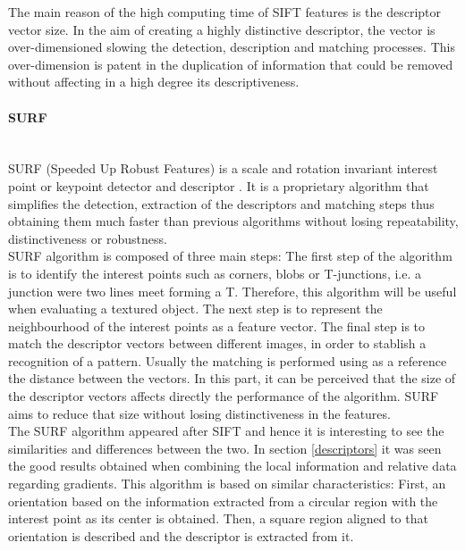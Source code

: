 The main reason of the high computing time of SIFT features is the descriptor vector size. 
In the aim of creating a highly distinctive descriptor, the vector is over-dimensioned slowing the detection, description and matching processes. 
This over-dimension is patent in the duplication of information that could be removed without affecting in a high degree its descriptiveness. 




\paragraph{SURF}\mbox{}\\

SURF (Speeded Up Robust Features) is a scale and rotation invariant interest point or keypoint detector and descriptor \cite{surf}. 
It is a proprietary algorithm that simplifies the detection, extraction of the descriptors and matching steps thus obtaining them much faster than previous algorithms without losing repeatability, distinctiveness or robustness. 
\\
\newpage
SURF algorithm is composed of three main steps: 
The first step of the algorithm is to identify the interest points such as corners, blobs or T-junctions, i.e. a junction were two lines meet forming a T. 
Therefore, this algorithm will be useful when evaluating a textured object.
The next step is to represent the neighbourhood of the interest points as a feature vector. 
The final step is to match the descriptor vectors between different images, in order to stablish a recognition of a pattern. Usually the matching is performed using as a reference the distance between the vectors. 
In this part, it can be perceived that the size of the descriptor vectors affects directly the performance of the algorithm. SURF aims to reduce that size without losing distinctiveness in the features. 
\\

The SURF algorithm appeared after SIFT and hence it is interesting to see the similarities and differences between the two. 
In section \ref{descriptors} it was seen the good results obtained when combining the local information and relative data regarding gradients. This algorithm is based on similar characteristics: 
First, an orientation based on the information extracted from a circular region with the interest point as its center is obtained. Then, a square region aligned to that orientation is described and the descriptor is extracted from it.  
\\

